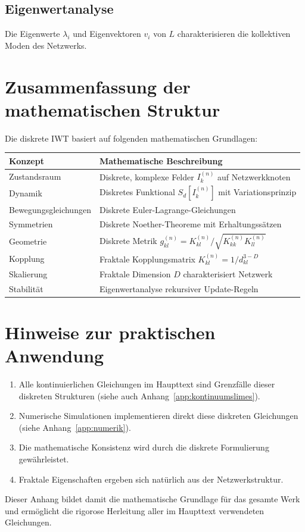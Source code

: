 \subsection{Eigenwertanalyse}
\label{sub:mathematik_eigenwerte}

Die Eigenwerte \( \lambda_i \) und Eigenvektoren \( v_i \) von \( L \) charakterisieren die kollektiven Moden des Netzwerks.

\section{Zusammenfassung der mathematischen Struktur}
\label{app:mathematik_zusammenfassung}

Die diskrete IWT basiert auf folgenden mathematischen Grundlagen:

\begin{tabular}{|l|l|}
\hline
\textbf{Konzept} & \textbf{Mathematische Beschreibung} \\
\hline
Zustandsraum & Diskrete, komplexe Felder \( I_k^{(n)} \) auf Netzwerkknoten \\
Dynamik & Diskretes Funktional \( S_d[I_k^{(n)}] \) mit Variationsprinzip \\
Bewegungsgleichungen & Diskrete Euler-Lagrange-Gleichungen \\
Symmetrien & Diskrete Noether-Theoreme mit Erhaltungssätzen \\
Geometrie & Diskrete Metrik \( g_{kl}^{(n)} = K_{kl}^{(n)} / \sqrt{K_{kk}^{(n)} K_{ll}^{(n)}} \) \\
Kopplung & Fraktale Kopplungsmatrix \( K_{kl}^{(n)} = 1/d_{kl}^{3-D} \) \\
Skalierung & Fraktale Dimension \( D \) charakterisiert Netzwerk \\
Stabilität & Eigenwertanalyse rekursiver Update-Regeln \\
\hline
\end{tabular}

\section{Hinweise zur praktischen Anwendung}
\label{app:mathematik_praxis}

\begin{enumerate}
    \item Alle kontinuierlichen Gleichungen im Haupttext sind Grenzfälle dieser diskreten Strukturen (siehe auch Anhang~\ref{app:kontinuumslimes}).
    \item Numerische Simulationen implementieren direkt diese diskreten Gleichungen (siehe Anhang~\ref{app:numerik}).
    \item Die mathematische Konsistenz wird durch die diskrete Formulierung gewährleistet.
    \item Fraktale Eigenschaften ergeben sich natürlich aus der Netzwerkstruktur.
\end{enumerate}

Dieser Anhang bildet damit die mathematische Grundlage für das gesamte Werk und ermöglicht die rigorose Herleitung aller im Haupttext verwendeten Gleichungen.